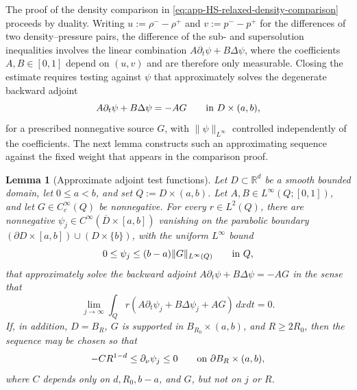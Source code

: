 \documentclass[11pt]{amsart}
\numberwithin{equation}{section}
\numberwithin{figure}{section}
\theoremstyle{plain}
\newtheorem{lem}[thm]{Lemma}
\theoremstyle{definition}
\theoremstyle{remark}
\theoremstyle{plain}
\newcommand{\norm}[1]{\lVert #1 \rVert}
\def\R{\mathbb{R}}
\begin{document}
The proof of the density comparison in
\eqref{eq:app-HS-relaxed-density-comparison} proceeds by duality.  Writing
\(u:=\rho^- -\rho^+\) and \(v:=p^- -p^+\) for the differences of two
density--pressure pairs, the
difference of the sub- and supersolution inequalities involves the linear
combination \(A\partial_t\psi+B\Delta\psi\), where the coefficients
\(A,B\in[0,1]\) depend on \((u,v)\) and are therefore only measurable.
Closing the estimate requires testing against \(\psi\) that approximately
solves the degenerate backward adjoint
\[
    A\partial_t\psi+B\Delta\psi=-AG
    \qquad\hbox{in }D\times(a,b),
\]
for a prescribed nonnegative source \(G\), with
\(\norm{\psi}_{L^\infty}\) controlled independently of the coefficients.  The
next lemma constructs such an approximating sequence against the fixed weight
that appears in the comparison proof.

\begin{lem}[Approximate adjoint test functions]\label{lem:app-HS-dual-tests}
Let \(D\subset\R^d\) be a smooth bounded domain, let \(0\leq a<b\), and
set \(Q:=D\times(a,b)\).  Let \(A,B\in L^\infty(Q;[0,1])\), and let
\(G\in C_c^\infty(Q)\) be nonnegative.  For every \(r\in L^2(Q)\), there are
nonnegative
\(\psi_j\in C^\infty(\overline D\times[a,b])\) vanishing on the parabolic
boundary \((\partial D\times[a,b])\cup(D\times\{b\})\), with the uniform
\(L^\infty\) bound
\begin{equation}\label{eq:app-HS-dual-test-bound}
    0\leq\psi_j\leq (b-a)\norm{G}_{L^\infty(Q)}
    \qquad\hbox{in }Q,
\end{equation}
that approximately solve the backward adjoint
\(A\partial_t\psi+B\Delta\psi=-AG\) in the sense that
\begin{equation}\label{eq:app-HS-dual-test-limit}
    \lim_{j\to\infty}
    \int_Q r\left(A\partial_t\psi_j+B\Delta\psi_j+AG\right)\,dxdt
    =0.
\end{equation}
If, in addition, \(D=B_R\), \(G\) is supported in
\(B_{R_0}\times(a,b)\), and \(R\geq2R_0\), then the sequence may be chosen
so that
\begin{equation}\label{eq:app-HS-dual-normal-bound}
    -C R^{1-d}\leq \partial_\nu\psi_j\leq0
    \qquad\hbox{on }\partial B_R\times(a,b),
\end{equation}
where \(C\) depends only on \(d,R_0,b-a\), and \(G\), but not on \(j\) or
\(R\).
\end{lem}
\end{document}
